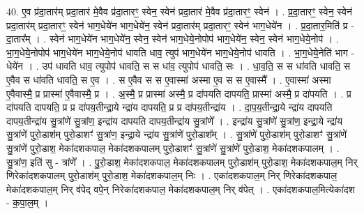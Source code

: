\documentclass[17pt]{extarticle}
\begin{document}
40. ए॒व प्र॑दा॒तार॑म् प्रदा॒तार॑ मे॒वैव प्र॑दा॒तारꣳ॒॒ स्वेन॒ स्वेन॑ प्रदा॒तार॑ मे॒वैव प्र॑दा॒तारꣳ॒॒ स्वेन॑ । . प्र॒दा॒तारꣳ॒॒ स्वेन॒ स्वेन॑ प्रदा॒तार॑म् प्रदा॒तारꣳ॒॒ स्वेन॑ भाग॒धेये॑न भाग॒धेये॑न॒ स्वेन॑ प्रदा॒तार॑म् प्रदा॒तारꣳ॒॒ स्वेन॑ भाग॒धेये॑न । . प्र॒दा॒तार॒मिति॑ प्र - दा॒तार᳚म् । . स्वेन॑ भाग॒धेये॑न भाग॒धेये॑न॒ स्वेन॒ स्वेन॑ भाग॒धेये॒नोपोप॑ भाग॒धेये॑न॒ स्वेन॒ स्वेन॑ भाग॒धेये॒नोप॑ । . भा॒ग॒धेये॒नोपोप॑ भाग॒धेये॑न भाग॒धेये॒नोप॑ धावति धाव॒ त्युप॑ भाग॒धेये॑न भाग॒धेये॒नोप॑ धावति । . भा॒ग॒धेये॒नेति॑ भाग - धेये॑न । . उप॑ धावति धाव॒ त्युपोप॑ धावति॒ स स धा॑व॒ त्युपोप॑ धावति॒ सः । . धा॒व॒ति॒ स स धा॑वति धावति॒ स ए॒वैव स धा॑वति धावति॒ स ए॒व । . स ए॒वैव स स ए॒वास्मा॑ अस्मा ए॒व स स ए॒वास्मै᳚ । . ए॒वास्मा॑ अस्मा ए॒वैवास्मै॒ प्र प्रास्मा॑ ए॒वैवास्मै॒ प्र । . अ॒स्मै॒ प्र प्रास्मा॑ अस्मै॒ प्र दा॑पयति दापयति॒ प्रास्मा॑ अस्मै॒ प्र दा॑पयति । . प्र दा॑पयति दापयति॒ प्र प्र दा॑पय॒तीन्द्रा॒ये न्द्रा॑य दापयति॒ प्र प्र दा॑पय॒तीन्द्रा॑य । . दा॒प॒य॒तीन्द्रा॒ये न्द्रा॑य दापयति दापय॒तीन्द्रा॑य सु॒त्रांणे॑ सु॒त्रांण॒ इन्द्रा॑य दापयति दापय॒तीन्द्रा॑य सु॒त्रांणे᳚ । . इन्द्रा॑य सु॒त्रांणे॑ सु॒त्रांण॒ इन्द्रा॒ये न्द्रा॑य सु॒त्रांणे॑ पुरो॒डाश॑म् पुरो॒डाशꣳ॑ सु॒त्रांण॒ इन्द्रा॒ये न्द्रा॑य सु॒त्रांणे॑ पुरो॒डाश᳚म् । . सु॒त्रांणे॑ पुरो॒डाश॑म् पुरो॒डाशꣳ॑ सु॒त्रांणे॑ सु॒त्रांणे॑ पुरो॒डाश॒ मेका॑दशकपाल॒ मेका॑दशकपालम् पुरो॒डाशꣳ॑ सु॒त्रांणे॑ सु॒त्रांणे॑ पुरो॒डाश॒ मेका॑दशकपालम् । . सु॒त्रांण॒ इति॑ सु - त्रांणे᳚ । . पु॒रो॒डाश॒ मेका॑दशकपाल॒ मेका॑दशकपालम् पुरो॒डाश॑म् पुरो॒डाश॒ मेका॑दशकपाल॒म् निर् णिरेका॑दशकपालम् पुरो॒डाश॑म् पुरो॒डाश॒ मेका॑दशकपाल॒म् निः । . एका॑दशकपाल॒म् निर् णिरेका॑दशकपाल॒ मेका॑दशकपाल॒म् निर् व॑पेद् वपे॒न् निरेका॑दशकपाल॒ मेका॑दशकपाल॒म् निर् व॑पेत् । . एका॑दशकपाल॒मित्येका॑दश - क॒पा॒ल॒म् । \newline
\end{document}
